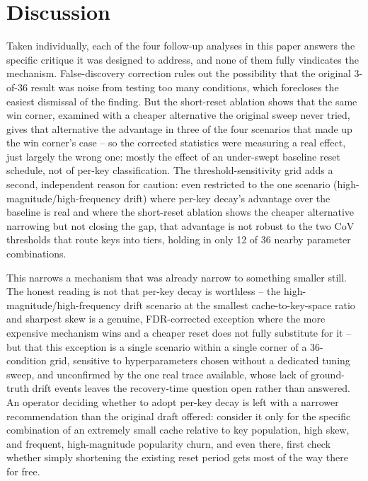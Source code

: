 \documentclass[11pt,letterpaper]{article}
\begin{document}
\section{Discussion}

Taken individually, each of the four follow-up analyses in this paper answers the specific critique it was designed to address, and none of them fully vindicates the mechanism. False-discovery correction rules out the possibility that the original 3-of-36 result was noise from testing too many conditions, which forecloses the easiest dismissal of the finding. But the short-reset ablation shows that the same win corner, examined with a cheaper alternative the original sweep never tried, gives that alternative the advantage in three of the four scenarios that made up the win corner's case -- so the corrected statistics were measuring a real effect, just largely the wrong one: mostly the effect of an under-swept baseline reset schedule, not of per-key classification. The threshold-sensitivity grid adds a second, independent reason for caution: even restricted to the one scenario (high-magnitude/high-frequency drift) where per-key decay's advantage over the baseline is real and where the short-reset ablation shows the cheaper alternative narrowing but not closing the gap, that advantage is not robust to the two CoV thresholds that route keys into tiers, holding in only 12 of 36 nearby parameter combinations.

This narrows a mechanism that was already narrow to something smaller still. The honest reading is not that per-key decay is worthless -- the high-magnitude/high-frequency drift scenario at the smallest cache-to-key-space ratio and sharpest skew is a genuine, FDR-corrected exception where the more expensive mechanism wins and a cheaper reset does not fully substitute for it -- but that this exception is a single scenario within a single corner of a 36-condition grid, sensitive to hyperparameters chosen without a dedicated tuning sweep, and unconfirmed by the one real trace available, whose lack of ground-truth drift events leaves the recovery-time question open rather than answered. An operator deciding whether to adopt per-key decay is left with a narrower recommendation than the original draft offered: consider it only for the specific combination of an extremely small cache relative to key population, high skew, and frequent, high-magnitude popularity churn, and even there, first check whether simply shortening the existing reset period gets most of the way there for free.
\end{document}
